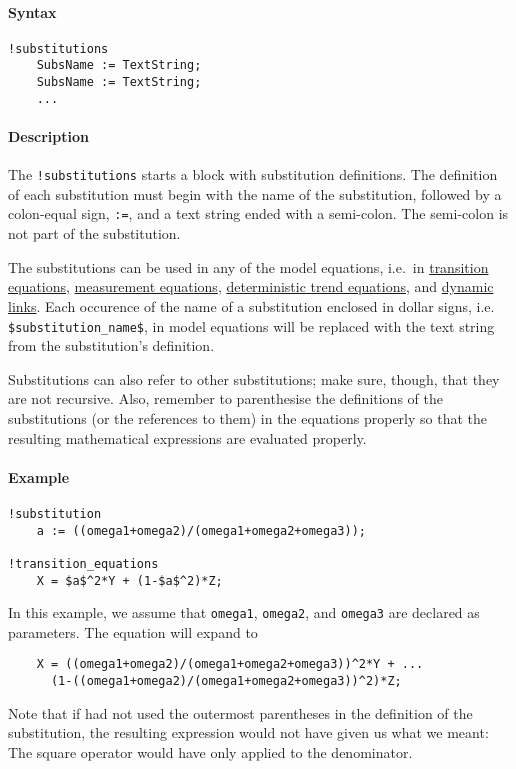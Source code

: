 


	\paragraph{Syntax}

\begin{verbatim}
!substitutions
    SubsName := TextString;
    SubsName := TextString;
    ...
\end{verbatim}

\paragraph{Description}

The \texttt{!substitutions} starts a block with substitution
definitions. The definition of each substitution must begin with the
name of the substitution, followed by a colon-equal sign, \texttt{:=},
and a text string ended with a semi-colon. The semi-colon is not part of
the substitution.

The substitutions can be used in any of the model equations, i.e.~in
\href{modellang/transitionequations}{transition equations},
\href{modellang/measurementequations}{measurement equations},
\href{modellang/dtrends}{deterministic trend equations}, and
\href{modellang/links}{dynamic links}. Each occurence of the name of a
substitution enclosed in dollar signs, i.e.
\texttt{\$substitution\_name\$}, in model equations will be replaced
with the text string from the substitution's definition.

Substitutions can also refer to other substitutions; make sure, though,
that they are not recursive. Also, remember to parenthesise the
definitions of the substitutions (or the references to them) in the
equations properly so that the resulting mathematical expressions are
evaluated properly.

\paragraph{Example}

\begin{verbatim}
!substitution
    a := ((omega1+omega2)/(omega1+omega2+omega3));

!transition_equations
    X = $a$^2*Y + (1-$a$^2)*Z;
\end{verbatim}

In this example, we assume that \texttt{omega1}, \texttt{omega2}, and
\texttt{omega3} are declared as parameters. The equation will expand to

\begin{verbatim}
    X = ((omega1+omega2)/(omega1+omega2+omega3))^2*Y + ...
      (1-((omega1+omega2)/(omega1+omega2+omega3))^2)*Z;
\end{verbatim}

Note that if had not used the outermost parentheses in the definition of
the substitution, the resulting expression would not have given us what
we meant: The square operator would have only applied to the
denominator.


